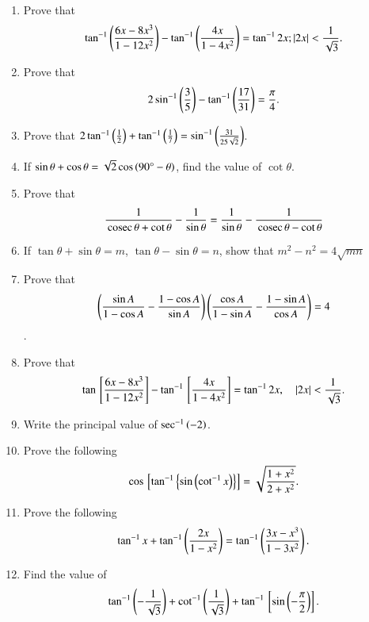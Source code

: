 \begin{enumerate}[label=\thesubsection.\arabic*,ref=\thesubsection.\theenumi,itemsep=1pt]
	\hfill{}
\item Prove that 
	\begin{align*}
	\tan^{-1} \left(\frac{6x-8x^{3}}{1-12x^{2}}\right) - \tan^{-1} \left(\frac{4x}{1-4x^{2}}\right) = \tan^{-1}2x;
		\left\vert2x\right\vert < \frac{1}{\sqrt{3}}
	.\end{align*}
 	\hfill{}\item Prove that 
	\begin{align*}
		2\sin^{-1}\left(\frac{3}{5}\right)-\tan^{-1}\left(\frac{17}{31}\right) = \frac{\pi}{4}
	.\end{align*}
	\hfill{}
\item Prove that $2\tan^{-1}\left(\frac{1}{2}\right)+\tan^{-1}\left(\frac{1}{7}\right) = \sin^{-1}\left(\frac{31}{25\sqrt{2}}\right)$. 
\hfill{}
\item If $\sin\theta+\cos\theta=\sqrt{2}\cos\left(90\degree{}-\theta\right)$, find the value of $\cot\theta$.
\hfill{}\item Prove that  $$\dfrac{1}{\,\text{cosec}\,\theta+\cot\theta}-\dfrac{1}{\sin\theta}=\dfrac{1}{\sin\theta}-\dfrac{1}{\,\text{cosec}\,\theta-\cot\theta}$$
\hfill{}\item If $\tan\theta+\sin\theta=m$, $\tan\theta-\sin\theta=n$, show that $m^{2}-n^{2}=4\sqrt{mn}$
\hfill{}\item Prove that  $$\left(\dfrac{\sin A}{1-\cos A}-\dfrac{1-\cos A}{\sin A}\right)\left(\dfrac{\cos A}{1-\sin A}-\dfrac{1-\sin A}{\cos A}\right)=4$$.
\hfill{}
\item Prove that $$\tan{}\left[\frac{6x-8x^3}{1-12x^2}\right]-\tan^{-1}{}\left[\frac{4x}{1-4x^2}\right]=\tan^{-1}2x, \quad |2x|<\frac{1}{\sqrt{3}}.$$
\hfill{}
\item Write the principal value of $\sec^{-1} \left(-2\right)$.
\hfill{}\item Prove the following
    \begin{align*}
        \cos {}\left[\tan^{-1} \left\{\sin \left(\cot^{-1} x\right)\right\}\right] = \sqrt{\frac{1 + x^2}{2 + x^2}}
    .\end{align*}
\hfill{}\item Prove the following
    \begin{align*}
        \tan^{-1} x + \tan^{-1} \left(\frac{2x}{1 - x^2}\right) = \tan^{-1} \left(\frac{3x - x^3}{1 - 3x^2}\right)
    .\end{align*}
\hfill{}
\item Find the value of $$\tan^{-1} \left(-\frac{1}{\sqrt{3}}\right) + \cot^{-1}\left(\frac{1}{\sqrt{3}}\right) + \tan^{-1}{}\left[\sin\left(-\frac{\pi}{2}\right)\right].$$

\end{enumerate}
